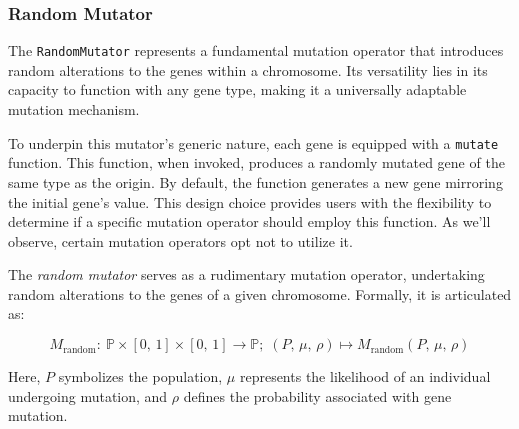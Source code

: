 \subsubsection{Random Mutator}
\label{sec:keen:operators:mutation:simple}

  The \texttt{RandomMutator} represents a fundamental mutation operator that
  introduces random alterations to the genes within a chromosome. Its versatility 
  lies in its capacity to function with any gene type, making it a universally 
  adaptable mutation mechanism.

  To underpin this mutator's generic nature, each gene is equipped with a
  \texttt{mutate} function. This function, when invoked, produces a randomly 
  mutated gene of the same type as the origin. By default, the function generates 
  a new gene mirroring the initial gene's value. This design choice provides 
  users with the flexibility to determine if a specific mutation operator should 
  employ this function. As we'll observe, certain mutation operators opt not to 
  utilize it.

  \begin{definition}
    The \emph{random mutator} serves as a rudimentary mutation operator, 
    undertaking random alterations to the genes of a given chromosome. 
    Formally, it is articulated as:

    \begin{equation}
      M_\mathrm{random} :\: \mathbb{P} \times [0,\, 1] \times [0,\, 1] \to 
      \mathbb{P};\;
      (P,\, \mu,\, \rho) \mapsto M_\mathrm{random}(P,\, \mu,\, \rho)
    \end{equation}

    Here, \(P\) symbolizes the population, \(\mu\) represents the likelihood of 
    an individual undergoing mutation, and \(\rho\) defines the probability 
    associated with gene mutation.
  \end{definition}


